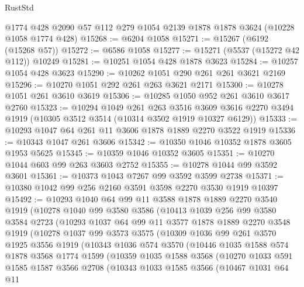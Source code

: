 \begin{lexlean}{RustStd}
\begin{coremodule}
    @1774
    @428
    @2090
    @57
    @112
    @279
    @1054
    @2139
    @1878
    @1878
    @3624
    (@10228 @1058 @1774 @428)
@15268 := @6204 @1058
@15271 := @15267 (@6192 (@15268 @57))
@15272 := @6586 @1058
@15277 := @15271 (@5537 (@15272 @42 @112)) @10249
@15281 := @10251 @1054 @428 @1878 @3623
@15284 := @10257 @1054 @428 @3623
@15290 := @10262 @1051 @290 @261 @261 @3621 @2169
@15296 := @10270 @1051 @292 @261 @263 @3621 @2171
@15300 := @10278 @1051 @261 @3610 @3619
@15306 := @10285 @1050 @952 @261 @3610 @3617 @2760
@15323 := @10294
    @1049
    @261
    @263
    @3516
    @3609
    @3616
    @2270
    @3494
    @1919
    (@10305 @3512 @3514 (@10314 @3502 @1919 @10327 @6129))
@15333 := @10293 @1047 @64 @261 @11 @3606 @1878 @1889 @2270 @3522 @1919
@15336 := @10343 @1047 @261 @3606
@15342 := @10350 @1046 @10352 @1878 @3605 @1953 @5625
@15345 := @10359 @1046 @10352 @3605
@15351 := @10270 @1044 @603 @99 @263 @3603 @2752
@15355 := @10278 @1044 @99 @3592 @3601
@15361 := @10373 @1043 @7267 @99 @3592 @3599 @2738
@15371 := @10380 @1042 @99 @256 @2160 @3591 @3598 @2270 @3530 @1919 @10397
@15492 := @10293
    @1040
    @64
    @99
    @11
    @3588
    @1878
    @1889
    @2270
    @3540
    @1919
    (@10278
      @1040
      @99
      @3580
      @3586
      (@10413
        @1039
        @256
        @99
        @3580
        @3584
        @2723
        (@10293
          @1037
          @64
          @99
          @11
          @3577
          @1878
          @1889
          @2270
          @3548
          @1919
          (@10278
            @1037
            @99
            @3573
            @3575
            (@10309
              @1036
              @99
              @261
              @3570
              @1925
              @3556
              @1919
              (@10343
                @1036
                @574
                @3570
                (@10446
                  @1035
                  @1588
                  @574
                  @1878
                  @3568
                  @1774
                  @1599
                  (@10359
                    @1035
                    @1588
                    @3568
                    (@10270
                      @1033
                      @591
                      @1585
                      @1587
                      @3566
                      @2708
                      (@10343
                        @1033
                        @1585
                        @3566
                        (@10467
                          @1031
                          @64
                          @11

\end{coremodule}
\end{lexlean}

